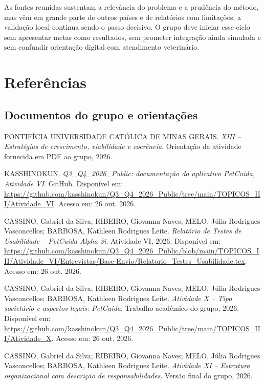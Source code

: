 \documentclass[12pt,a4paper]{article}
\begin{document}
As fontes reunidas sustentam a relevância do problema e a prudência do método, mas vêm em grande parte de outros países e de relatórios com limitações; a validação local continua sendo o passo decisivo. O grupo deve iniciar esse ciclo sem apresentar metas como resultados, sem prometer integração ainda simulada e sem confundir orientação digital com atendimento veterinário.

\clearpage
\section*{Referências}
\small
\subsection*{Documentos do grupo e orientações}
\begin{enumerate}[label={[\arabic*]},leftmargin=1.3cm,itemsep=0.2em]
\item PONTIFÍCIA UNIVERSIDADE CATÓLICA DE MINAS GERAIS. \textit{XIII -- Estratégias de crescimento, viabilidade e coerência}. Orientação da atividade fornecida em PDF ao grupo, 2026.
\item KASSHINOKUN. \textit{Q3\_Q4\_2026\_Public: documentação do aplicativo PetCuida, Atividade VI}. GitHub. Disponível em: \url{https://github.com/kasshinokun/Q3_Q4_2026_Public/tree/main/TOPICOS_III/Atividade_VI}. Acesso em: 26 out. 2026.
\item CASSINO, Gabriel da Silva; RIBEIRO, Giovanna Naves; MELO, Júlia Rodrigues Vasconcellos; BARBOSA, Kathleen Rodrigues Leite. \textit{Relatório de Testes de Usabilidade -- PetCuida Alpha 3i}. Atividade VI, 2026. Disponível em: \url{https://github.com/kasshinokun/Q3_Q4_2026_Public/blob/main/TOPICOS_III/Atividade_VI/Entrevistas/Base-Envio/Relatorio_Testes_Usabilidade.tex}. Acesso em: 26 out. 2026.
\item CASSINO, Gabriel da Silva; RIBEIRO, Giovanna Naves; MELO, Júlia Rodrigues Vasconcellos; BARBOSA, Kathleen Rodrigues Leite. \textit{Atividade X -- Tipo societário e aspectos legais: PetCuida}. Trabalho acadêmico do grupo, 2026. Disponível em: \url{https://github.com/kasshinokun/Q3_Q4_2026_Public/tree/main/TOPICOS_III/Atividade_X}. Acesso em: 26 out. 2026.
\item CASSINO, Gabriel da Silva; RIBEIRO, Giovanna Naves; MELO, Júlia Rodrigues Vasconcellos; BARBOSA, Kathleen Rodrigues Leite. \textit{Atividade XI -- Estrutura organizacional com descrição de responsabilidades}. Versão final do grupo, 2026.
\end{enumerate}
\end{document}
